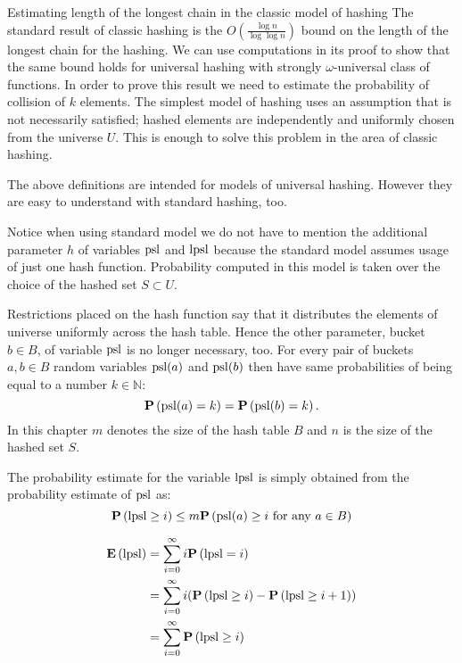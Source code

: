 \begin{section}{Estimating length of the longest chain in the classic model of hashing}
The standard result of classic hashing is the $O\left(\frac{\log n}{\log \log n}\right)$ bound on the length of the longest chain for the hashing. We can use computations in its proof to show that the same bound holds for universal hashing with strongly $\omega$-universal class of functions. In order to prove this result we need to estimate the probability of collision of $k$ elements. The simplest model of hashing uses an assumption that is not necessarily satisfied; hashed elements are independently and uniformly chosen from the universe $U$. This is enough to solve this problem in the area of classic hashing. 

The above definitions are intended for models of universal hashing. However they are easy to understand with standard hashing, too. 

Notice when using standard model we do not have to mention the additional parameter $h$ of variables $\mathrm{psl}$ and $\mathrm{lpsl}$ because the standard model assumes usage of just one hash function. Probability computed in this model is taken over the choice of the hashed set $S \subset U$. 

Restrictions placed on the hash function say that it distributes the elements of universe uniformly across the hash table. Hence the other parameter, bucket $b \in B$, of variable $\mathrm{psl}$ is no longer necessary, too. For every pair of buckets $a, b \in B$ random variables $\mathrm{psl}(a)$ and $\mathrm{psl}(b)$ then have same probabilities of being equal to a number $k \in \mathbb{N}$: \[\mathbf{P}\left(\mathrm{psl}(a) = k\right) = \mathbf{P}\left(\mathrm{psl}(b) = k\right) \text{.}\] In this chapter $m$ denotes the size of the hash table $B$ and $n$ is the size of the hashed set $S$.

The probability estimate for the variable $\mathrm{lpsl}$ is simply obtained from the probability estimate of $\mathrm{psl}$ as:
\begin{displaymath}
\mathbf{P}\left(\mathrm{lpsl} \geq i\right) \leq m \mathbf{P}\left(\mathrm{psl}(a) \geq i \text{ for any } a \in B\right)
\end{displaymath}

\begin{displaymath}
\begin{split}
\mathbf{E}\left(\mathrm{lpsl}\right)
	& = \displaystyle \sum_{i=0}^{\infty} i \mathbf{P}\left(\mathrm{lpsl} = i\right) \\
	& = \displaystyle \sum_{i = 0}^{\infty} i (\mathbf{P}\left(\mathrm{lpsl} \geq i\right) - \mathbf{P}\left(\mathrm{lpsl} \geq i + 1\right)) \\ 
	& = \displaystyle \sum_{i = 0}^{\infty} \mathbf{P}\left(\mathrm{lpsl} \geq i\right)
\end{split}
\end{displaymath}


\end{section}
